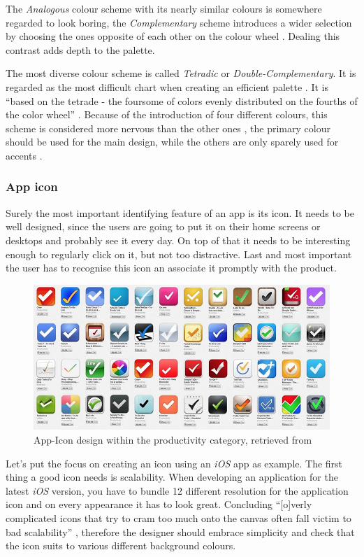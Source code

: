 The \emph{Analogous} colour scheme with its nearly similar colours is somewhere regarded to look boring, the \emph{Complementary} scheme introduces a wider selection by choosing the ones opposite of each other on the colour wheel \cite{Chapman:2010ab}. Dealing this contrast adds depth to the palette.

The most diverse colour scheme is called \emph{Tetradic} or \emph{Double-Complementary}. It is regarded as the most difficult chart when creating an efficient palette \cite{Chapman:2010ab}. It is \enquote{based on the tetrade - the foursome of colors evenly distributed on the fourths of the color wheel} \cite{Stanicek:2011aa}. Because of the introduction of four different colours, this scheme is considered more nervous than the other ones \cite{Stanicek:2011aa}, the primary colour should be used for the main design, while the others are only sparely used for accents \cite{Chapman:2010ab}.

\subsubsection{App icon}
\label{sec:Icon}
Surely the most important identifying feature of an app is its icon. It needs to be well designed, since the users are going to put it on their home screens or desktops and probably see it every day. On top of that it needs to be interesting enough to regularly click on it, but not too distractive. Last and most important the user has to recognise this icon an associate it promptly with the product. \cite{Flarup:2015aa}

\begin{figure}[h]
  	\centering
  	\includegraphics[width=0.7\linewidth]{./images/productivity-icons.png}
  	\caption{App-Icon design within the productivity category, retrieved from \cite{Flarup:2015aa}}
	\label{fig:AppProd}
\end{figure}
\nocite{Flarup:2015aa}

Let's put the focus on creating an icon using an \emph{iOS} app as example. The first thing a good icon needs is scalability. When developing an application for the latest \emph{iOS} version, you have to bundle 12 different resolution for the application icon and on every appearance it has to look great. Concluding \enquote{[o]verly complicated icons that try to cram too much onto the canvas often fall victim to bad scalability} \cite{Flarup:2015aa}, therefore the designer should embrace simplicity and check that the icon suits to various different background colours. \cite{Flarup:2015aa}

